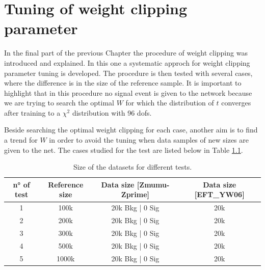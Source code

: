 \chapter{Tuning of weight clipping parameter}
\label{chap:W_CLIP}





In the final part of the previous Chapter the procedure of weight clipping was introduced and explained. In this one a systematic approch for weight clipping parameter tuning is developed. The procedure is then tested with several cases, where the difference is in the size of the reference sample. It is important to highlight that in this procedure no signal event is given to the network because we are trying to search the optimal $W$ for which the distribution of $t$ converges after training to a $\chi^2$ distribution with 96 dofs.

Beside searching the optimal weight clipping for each case, another aim is to find a trend for $W$ in order to avoid the tuning when data samples of new sizes are given to the net. The cases studied for the test are listed below in Table \ref{tab:W_CLIP_TEST_SIZES}.

\begin{table}[H]
	\centering
	\begin{tabular}{c c c c}
		\toprule
		\toprule
		n° of test	&	Reference size	&	Data size [\textbf{Zmumu-Zprime}]	&	Data size [\textbf{EFT\_YW06}]	\\
		\midrule
		1			&	100k			&	20k Bkg | 0 Sig				&	20k			\\
		2			&	200k			&	20k Bkg | 0 Sig				&	20k			\\
		3			&	300k			&	20k Bkg | 0 Sig				&	20k			\\
		4			&	500k			&	20k Bkg | 0 Sig				&	20k			\\
		5			&	1000k			&	20k Bkg | 0 Sig				&	20k			\\
		\bottomrule
		\bottomrule
	\end{tabular}
	\caption{Size of the datasets for different tests.}
	\label{tab:W_CLIP_TEST_SIZES}
\end{table}





